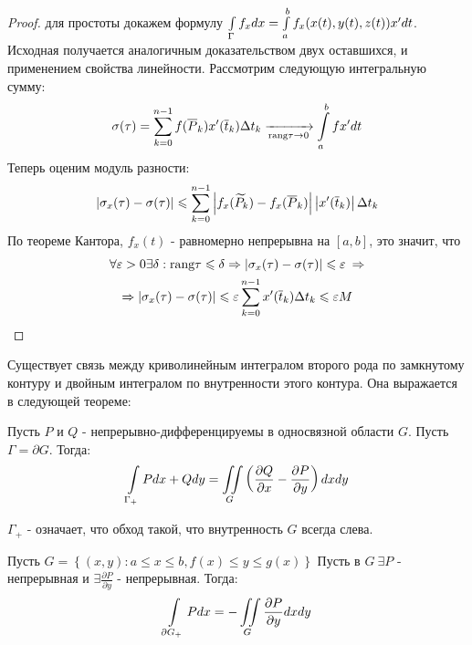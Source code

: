 \begin{proof}
	для простоты докажем формулу
	$\int\limits_{\Gamma} f_xdx = \int\limits_{a}^{b}f_x(x(t), y(t), z(t))x' dt$. 
	Исходная получается аналогичным доказательством двух оставшихся, и применением свойства линейности. 
	Рассмотрим следующую интегральную сумму:
	\begin{gather*}
		\sigma(\tau) = \sum\limits_{k = 0}^{n - 1} f(\overline{P}_k)x'(\overline{t}_k)\Delta t_k
		\xrightarrow[\text{rang}\tau \rightarrow 0]{} \int\limits_{a}^{b} f x' dt
	\end{gather*}
	Теперь оценим модуль разности: 
	\begin{gather*}
		\left|\sigma_x(\tau) - \sigma(\tau)\right| \leqslant 
		\sum\limits_{k = 0}^{n - 1} \left|f_x(\widetilde{P}_k) - f_x(\overline{P}_k)\right|
		\left|x'(\overline{t}_k)\right| \Delta t_k
	\end{gather*}
	По теореме Кантора, $f_x(t)$ - равномерно непрерывна на $[a, b]$, это значит, что
	\begin{gather*}
		\forall\varepsilon > 0 \exists \delta : \text{rang}\tau \leqslant \delta \Rightarrow 
		\left|\sigma_x(\tau) - \sigma(\tau)\right| \leqslant \varepsilon  \: \Rightarrow\\
		\Rightarrow \left|\sigma_x(\tau) - \sigma(\tau)\right| \leqslant 
		\varepsilon \sum\limits_{k = 0}^{n - 1} x'(\overline{t}_k) \Delta t_k \leqslant \varepsilon M
	\end{gather*}
\end{proof}

Существует связь между криволинейным интегралом второго рода по замкнутому контуру и 
двойным интегралом по внутренности этого контура. Она выражается в следующей теореме:

\begin{theorem}
	Пусть $P$ и $Q$ - непрерывно-дифференцируемы в односвязной области $G$. Пусть $\Gamma = \partial G$.
	Тогда:
	\begin{gather*}
		\int\limits_{\Gamma_{+}} Pdx + Qdy = 
		\iint\limits_{G} \left( \frac{\partial Q}{\partial x} - \frac{\partial P}{\partial y} \right) dxdy
	\end{gather*}
\end{theorem}

$\Gamma_{+}$ - означает, что обход такой, что внутренность $G$ всегда слева.

\newpage

\begin{lemma}
	Пусть $G = \left\{(x, y) : a\leqslant x \leqslant b, f(x) \leqslant y \leqslant g(x)  \right\} $
	Пусть в $G \: \exists P$ - непрерывная и $\exists \frac{\partial P}{\partial y}$ - непрерывная.
	Тогда:
	\begin{gather*}
		\int\limits_{\partial G_{+}} Pdx = -\iint\limits_{G} \frac{\partial P}{\partial y} dxdy 
	\end{gather*}
\end{lemma}


